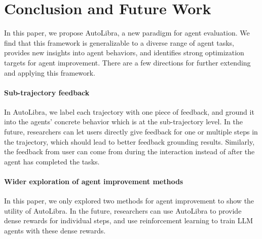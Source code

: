 \section{Conclusion and Future Work}
In this paper, we propose AutoLibra, a new paradigm for agent evaluation.
We find that this framework is generalizable to a diverse range of agent tasks, provides new insights into agent behaviors,
and identifies strong optimization targets for agent improvement. There are a few directions for further extending and applying this framework. 

\paragraph{Sub-trajectory feedback} In AutoLibra, we label each trajectory with one piece of feedback, and ground it into the agents' concrete behavior which is at the sub-trajectory level. In the future, researchers can let users directly give feedback for one or multiple steps in the trajectory, which should lead to better feedback grounding results. Similarly, the feedback from user can come from during the interaction instead of after the agent has completed the tasks. 

\paragraph{Wider exploration of  agent improvement methods} In this paper, we only explored two methods for agent improvement to show the utility of AutoLibra. In the future, researchers can use AutoLibra to provide dense rewards for individual steps, and use reinforcement learning to train LLM agents with these dense rewards. 